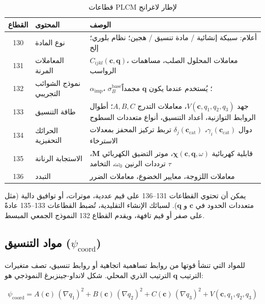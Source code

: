\documentclass[11pt,a4paper]{article}
\begin{document}
\begin{otherlanguage}{arabic}
		\begin{table}[htbp]
			\centering
			\caption{قطاعات PLCM لإطار لاغرانج}
			\label{tab:sectors}
			\begin{tabular}{clp{8cm}}
				\toprule
				\textbf{القطاع} & \textbf{المحتوى} & \textbf{الوصف} \\
				\midrule
				130 & نوع المادة & أعلام: سبيكة إنشائية / مادة تنسيق / هجين؛ نظام بلوري؛ إلخ \\
				131 & المعاملات المرنة & \(C_{ijkl}(\mathbf{c}, \mathbf{q})\)، معاملات المحلول الصلب، مساهمات الرواسب \\
				132 & نموذج الشوائب التجريبي & \(\alpha_{\mathrm{imp}}\)، \(\sigma_B^{\mathrm{base}}\)؛ يُستخدم عندما يكون \(\mathbf{q}\) مجمداً \\
				133 & طاقة التنسيق & جهد \(V(\mathbf{c}, q_1,q_2,q_3)\)، معاملات التدرج \(A,B,C\)؛ أطوال الروابط التوازنية، أعداد التنسيق، أنواع متعددات السطوح \\
				134 & الحرائك التحفيزية & دوال \(\gamma_i(\mathbf{c}_{\mathrm{cat}})\)، \(\delta_j(\mathbf{c}_{\mathrm{cat}})\) تربط تركيز المحفز بمعدلات الاسترخاء \\
				135 & الاستجابة الرنانة & قابلية كهربائية \(\boldsymbol{\chi}(\mathbf{c},\mathbf{q},\omega)\)، موتر التضيق الكهربائي \(\mathbf{M}\)، ترددات الرنين \(\omega_0\)، التخامد \(\tau\) \\
				136 & التبدد & معاملات اللزوجة، معايير الخضوع، معاملات الضرر \\
				\bottomrule
			\end{tabular}
		\end{table}
		
		يمكن أن تحتوي القطاعات 131–136 على قيم عددية، موترات، أو توافيق دالية (مثل متعددات الحدود في \(\mathbf{c}\) و \(\mathbf{q}\)). لسبائك الإنشاء التقليدية، تُضبط القطاعات 133–135 عادةً على صفر أو قيم تافهة، ويقدم القطاع 132 النموذج الجمعي المبسط.
		
		\subsection{مواد التنسيق (\(\psi_{\mathrm{coord}}\))}
		\label{subsec:coordination}
		
		للمواد التي تنشأ قوتها من روابط تساهمية اتجاهية أو روابط تنسيق، تصف متغيرات الترتيب \(\mathbf{q}\) الترتيب الذري المحلي. شكل لانداو-جينزبرغ النموذجي هو:
		
		\[
		\psi_{\mathrm{coord}} = A(\mathbf{c})\,(\nabla q_1)^2 + B(\mathbf{c})\,(\nabla q_2)^2 + C(\mathbf{c})\,(\nabla q_3)^2 + V(\mathbf{c}, q_1, q_2, q_3)
		\]
		

\end{otherlanguage}
\end{document}
